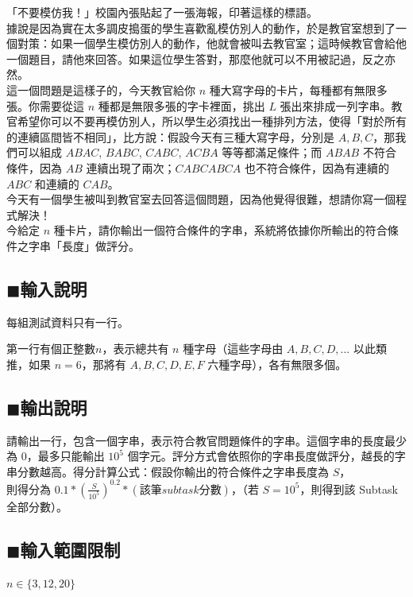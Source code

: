 \documentclass[12pt,a4paper]{article}
\begin{document}
「不要模仿我！」校園內張貼起了一張海報，印著這樣的標語。\\

據說是因為實在太多調皮搗蛋的學生喜歡亂模仿別人的動作，於是教官室想到了一個對策：如果一個學生模仿別人的動作，他就會被叫去教官室；這時候教官會給他一個題目，請他來回答。如果這位學生答對，那麼他就可以不用被記過，反之亦然。\\

這一個問題是這樣子的，今天教官給你 $n$ 種大寫字母的卡片，每種都有無限多張。你需要從這 $n$ 種都是無限多張的字卡裡面，挑出 $L$ 張出來排成一列字串。教官希望你可以不要再模仿別人，所以學生必須找出一種排列方法，使得「對於所有的連續區間皆不相同」，比方說：假設今天有三種大寫字母，分別是 $A, B, C$，那我們可以組成 $ABAC$, $BABC$, $CABC$, $ACBA$ 等等都滿足條件；而 $ABAB$ 不符合條件，因為 $AB$ 連續出現了兩次；$CABCABCA$ 也不符合條件，因為有連續的 $ABC$ 和連續的 $CAB$。\\

今天有一個學生被叫到教官室去回答這個問題，因為他覺得很難，想請你寫一個程式解決！\\

今給定 $n$ 種卡片，請你輸出一個符合條件的字串，系統將依據你所輸出的符合條件之字串「長度」做評分。

\subsection*{$\blacksquare$輸入說明}
每組測試資料只有一行。\par
第一行有個正整數\(n\)，表示總共有 $n$ 種字母（這些字母由 $A, B, C, D, ...$ 以此類推，如果 $n = 6$，那將有 $A, B, C, D, E, F$ 六種字母），各有無限多個。\par

\subsection*{$\blacksquare$輸出說明}
請輸出一行，包含一個字串，表示符合教官問題條件的字串。這個字串的長度最少為 0，最多只能輸出 $10^5$ 個字元。評分方式會依照你的字串長度做評分，越長的字串分數越高。得分計算公式：假設你輸出的符合條件之字串長度為 $S$，\\

則得分為 $0.1*(\frac{S}{10^5})^{0.2} * (該筆 subtask 分數)$，（若 $S = 10^5$，則得到該 Subtask 全部分數）。

\subsection*{$\blacksquare$輸入範圍限制}
\( n \in \{3, 12, 20\} \) \par
\end{document}

